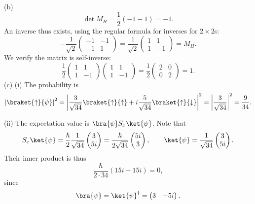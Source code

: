 \documentclass[11pt, letterpaper]{article}
\begin{document}
(b)
\[
	\det M_H = \frac{1}{2} \left( -1-1 \right) =-1
.\]
An inverse thus exists, using the regular formula for inverses for $2\times 2$s:
\[
	-\frac{1}{\sqrt{2} } \begin{pmatrix}
	-1 & -1 \\
	-1 & 1
	\end{pmatrix}=\frac{1}{\sqrt{2} } \begin{pmatrix}
	1 & 1 \\
	1 & -1
	\end{pmatrix}=M_H
.\]
We verify the matrix is self-inverse:
\[
	\frac{1}{2} \begin{pmatrix}
	1 & 1 \\
	1 & -1
	\end{pmatrix}\begin{pmatrix}
	1 & 1 \\
	1 & -1
	\end{pmatrix}=\frac{1}{2} \begin{pmatrix}
	2 & 0 \\
	0 & 2
	\end{pmatrix}=1
.\]
(c) (i) The probability is
\[
	\left| \braket{\uparrow}{\psi } \right| ^2=\left| \frac{3}{\sqrt{34} } \braket{\uparrow}{\uparrow}+i\frac{5}{\sqrt{34} } \braket{\uparrow}{\downarrow} \right| ^2=\left| \frac{3}{\sqrt{34} }  \right| ^2=\frac{9}{34} 
.\]

(ii) The expectation value is $\bra{\psi }S_x\ket{\psi }$. Note that
\[
	S_x\ket{\psi }=\frac{\hbar}{2} \frac{1}{\sqrt{34} } \begin{pmatrix}
	3 \\
	5i
\end{pmatrix}=\frac{\hbar}{2\sqrt{34} } \begin{pmatrix}
5i \\
3
\end{pmatrix},\qquad \ket{\psi }=\frac{1}{\sqrt{34} } \begin{pmatrix}
3 \\
5i
\end{pmatrix}
.\]
Their inner product is thus
\[
	\frac{\hbar}{2\cdot 34} \left( 15i-15i \right) =0,
\]
since
\[
	\bra{\psi }=\ket{\psi }^\dagger=\begin{pmatrix}
	3 & -5i
	\end{pmatrix}
.\]
\end{document}
